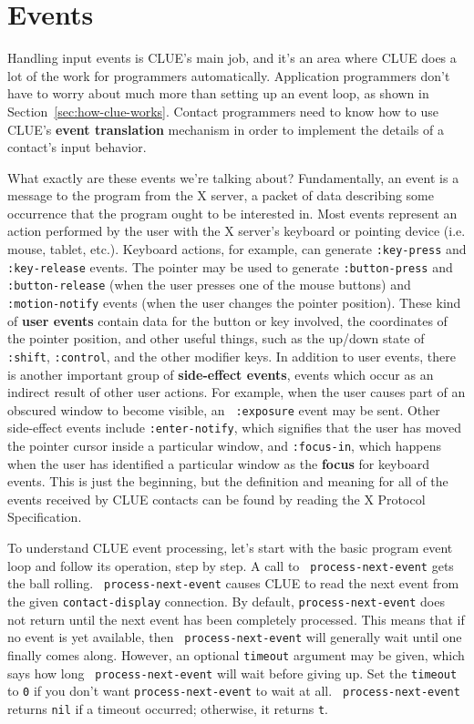 \section{Events\label{sec:events}}
Handling input events is CLUE's main job, and it's an area where CLUE does a lot
of the work for programmers automatically. Application programmers don't have to
worry about much more than setting up an event loop, as shown in
Section~\ref{sec:how-clue-works}. Contact programmers need to know how to use
CLUE's {\bf event translation} mechanism in order to
implement the details of a contact's input behavior.

What exactly are these events we're talking about? Fundamentally, an event is
a message to the program from the X server, a packet of data describing
some occurrence that the program ought to be interested in.
Most events
represent an action performed by the user with  the X server's 
keyboard or pointing device (i.e. mouse, tablet,
etc.). Keyboard
actions, for example, can generate {\tt :key-press} and {\tt :key-release}
events. The pointer may be used to generate {\tt :button-press} and {\tt
:button-release} (when the user presses one of the mouse buttons) and {\tt
:motion-notify} events (when the user changes the pointer position). These kind of
{\bf user events} contain data for the button or key
involved, the coordinates of the pointer position, and other useful things, such as
the up/down state of {\tt :shift}, {\tt :control}, and the other modifier keys.
In addition to user events, there is another important group of {\bf side-effect
events},
events which occur as an indirect result of other user actions. For example,
when the user causes part of an obscured window to become visible, an {\tt
:exposure} event may be sent. Other side-effect events include
{\tt :enter-notify}, which signifies that the user has moved the pointer cursor
inside a particular window, and {\tt :focus-in}, which happens when the user has
identified a particular window as the {\bf focus} for keyboard
events.
This is just the beginning, but the definition and meaning for all of the events
received by CLUE contacts can be found by reading the X Protocol Specification.


To understand CLUE event processing, let's start with the basic program event
loop and follow its operation, step by step.
A call to {\tt
process-next-event} 
gets the ball rolling. {\tt
process-next-event} causes CLUE to read
the next event from the given {\tt contact-display} connection. By default,
{\tt pro\-cess\--next\--ev\-ent} does not return until the next event has been
completely processed. This means that if no event is yet available, then {\tt
process-next-event} will generally wait until one finally comes along. However,
an optional {\tt timeout} argument may be given, which says how long {\tt
process-next-event} will wait before giving up. Set the {\tt timeout} to {\tt 0}
if you don't want {\tt process-next-event} to wait at all. {\tt
process-next-event} returns {\tt nil} if a timeout occurred; otherwise, it
returns {\tt t}.


